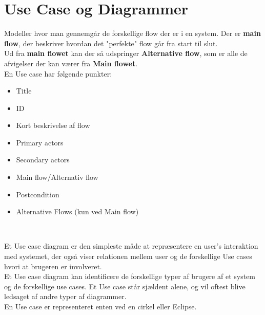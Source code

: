 \section{Use Case og Diagrammer}

\begin{tcolorbox}[colback=red!10!white,colframe=red!75!black,title=\enumlemma{Use cases} ]
Modeller hvor man gennemgår de forskellige flow der er i en system. Der er \textbf{main flow}, der beskriver hvordan det "perfekte" flow går fra start til slut.\\
Ud fra \textbf{main flowet} kan der så udspringer \textbf{Alternative flow}, som er alle de afvigelser der kan værer fra \textbf{Main flowet}.\\
En Use case har følgende punkter:
\begin{itemize}
    \item Title
    \item ID
    \item Kort beskrivelse af flow
    \item Primary actors
    \item Secondary actors
    \item Main flow/Alternativ flow
    \item Postcondition
    \item Alternative Flows (kun ved Main flow)
\end{itemize}
\end{tcolorbox}\\

\begin{tcolorbox}[colback=red!10!white,colframe=red!75!black,title=\enumlemma{Use case diagram}]
Et Use case diagram er den simpleste måde at repræsentere en user's interaktion med systemet, der også viser relationen mellem user og de forskellige Use cases hvori at brugeren er involveret.\\
Et Use case diagram kan identificere de forskellige typer af brugere af et system og de forskellige use cases. Et Use case står sjældent alene, og vil oftest blive ledsaget af andre typer af diagrammer.\\
En Use case er representeret enten ved en cirkel eller Eclipse.
\end{tcolorbox}\\